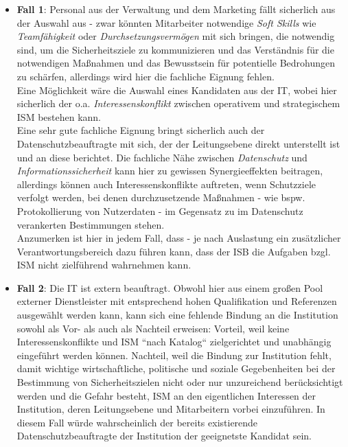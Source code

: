 \begin{itemize}
    \itemsep0.5em
    \item \textbf{Fall 1}: Personal aus der Verwaltung und dem Marketing fällt sicherlich aus der Auswahl aus - zwar könnten Mitarbeiter notwendige \textit{Soft Skills} wie \textit{Teamfähigkeit} oder \textit{Durchsetzungsvermögen} mit sich bringen, die notwendig sind, um die Sicherheitsziele zu kommunizieren und das Verständnis für die notwendigen Maßnahmen und das Bewusstsein für potentielle Bedrohungen zu schärfen, allerdings wird hier die fachliche Eignung fehlen.\\
    Eine Möglichkeit wäre die Auswahl eines Kandidaten aus der IT, wobei hier sicherlich der o.a. \textit{Interessenskonflikt} zwischen operativem und strategischem ISM bestehen kann.\\
     Eine sehr gute fachliche Eignung bringt sicherlich auch der Datenschutzbeauftragte mit sich, der der Leitungsebene direkt unterstellt ist und an diese berichtet.
     Die fachliche Nähe zwischen \textit{Datenschutz} und \textit{Informationssicherheit} kann hier zu gewissen Synergieeffekten beitragen, allerdings können auch Interessenskonflikte auftreten, wenn Schutzziele verfolgt werden, bei denen durchzusetzende Maßnahmen - wie bspw. Protokollierung von Nutzerdaten - im Gegensatz zu im Datenschutz verankerten Bestimmungen stehen.\\
     Anzumerken ist hier in jedem Fall, dass - je nach Auslastung  ein zusätzlicher Verantwortungsbereich dazu führen kann, dass der ISB die Aufgaben bzgl. ISM nicht zielführend wahrnehmen kann.
    \item \textbf{Fall 2}: Die IT ist extern beauftragt.
    Obwohl hier aus einem großen Pool externer Dienstleister mit entsprechend hohen Qualifikation und Referenzen ausgewählt werden kann, kann sich eine fehlende Bindung an die Institution sowohl als Vor- als auch als Nachteil erweisen: Vorteil, weil keine Interessenskonflikte und ISM ``nach Katalog`` zielgerichtet und unabhängig eingeführt werden können.
    Nachteil, weil die Bindung zur Institution fehlt, damit wichtige wirtschaftliche, politische und soziale Gegebenheiten bei der Bestimmung von Sicherheitszielen nicht oder nur unzureichend berücksichtigt werden und die Gefahr besteht, ISM an den eigentlichen Interessen der Institution, deren Leitungsebene und Mitarbeitern vorbei einzuführen.
    In diesem Fall würde wahrscheinlich der bereits existierende Datenschutzbeauftragte der Institution der geeignetste Kandidat sein.
\end{itemize}